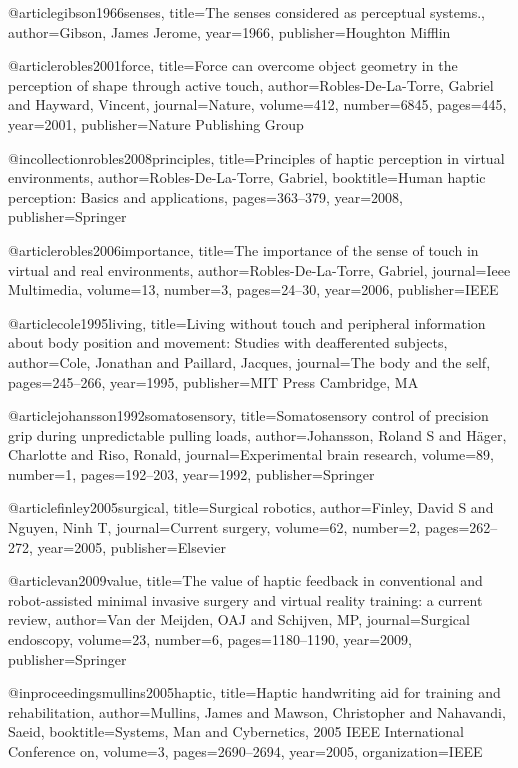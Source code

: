 @article{gibson1966senses,
  title={The senses considered as perceptual systems.},
  author={Gibson, James Jerome},
  year={1966},
  publisher={Houghton Mifflin}
}

@article{robles2001force,
  title={Force can overcome object geometry in the perception of shape through active touch},
  author={Robles-De-La-Torre, Gabriel and Hayward, Vincent},
  journal={Nature},
  volume={412},
  number={6845},
  pages={445},
  year={2001},
  publisher={Nature Publishing Group}
}

@incollection{robles2008principles,
  title={Principles of haptic perception in virtual environments},
  author={Robles-De-La-Torre, Gabriel},
  booktitle={Human haptic perception: Basics and applications},
  pages={363--379},
  year={2008},
  publisher={Springer}
}

@article{robles2006importance,
  title={The importance of the sense of touch in virtual and real environments},
  author={Robles-De-La-Torre, Gabriel},
  journal={Ieee Multimedia},
  volume={13},
  number={3},
  pages={24--30},
  year={2006},
  publisher={IEEE}
}

@article{cole1995living,
  title={Living without touch and peripheral information about body position and movement: Studies with deafferented subjects},
  author={Cole, Jonathan and Paillard, Jacques},
  journal={The body and the self},
  pages={245--266},
  year={1995},
  publisher={MIT Press Cambridge, MA}
}

@article{johansson1992somatosensory,
  title={Somatosensory control of precision grip during unpredictable pulling loads},
  author={Johansson, Roland S and H{\"a}ger, Charlotte and Riso, Ronald},
  journal={Experimental brain research},
  volume={89},
  number={1},
  pages={192--203},
  year={1992},
  publisher={Springer}
}

@article{finley2005surgical,
  title={Surgical robotics},
  author={Finley, David S and Nguyen, Ninh T},
  journal={Current surgery},
  volume={62},
  number={2},
  pages={262--272},
  year={2005},
  publisher={Elsevier}
}

@article{van2009value,
  title={The value of haptic feedback in conventional and robot-assisted minimal invasive surgery and virtual reality training: a current review},
  author={Van der Meijden, OAJ and Schijven, MP},
  journal={Surgical endoscopy},
  volume={23},
  number={6},
  pages={1180--1190},
  year={2009},
  publisher={Springer}
}

@inproceedings{mullins2005haptic,
  title={Haptic handwriting aid for training and rehabilitation},
  author={Mullins, James and Mawson, Christopher and Nahavandi, Saeid},
  booktitle={Systems, Man and Cybernetics, 2005 IEEE International Conference on},
  volume={3},
  pages={2690--2694},
  year={2005},
  organization={IEEE}
}

